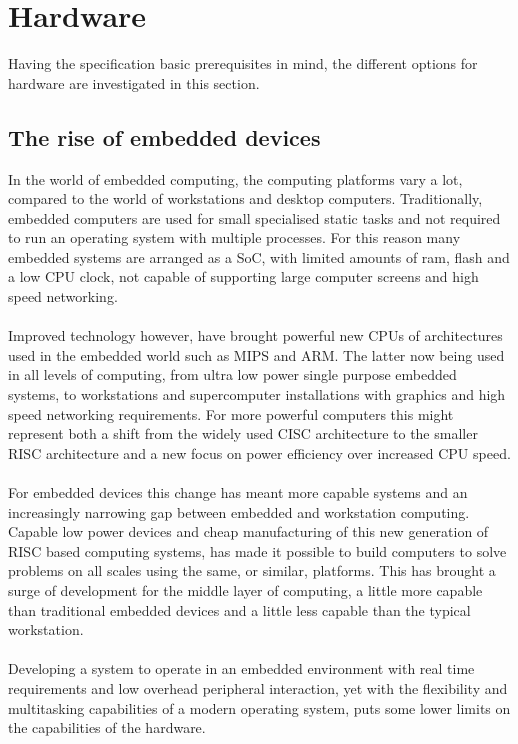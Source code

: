 \section{Hardware}
Having the \arinc{} specification basic prerequisites in mind, the
different options for hardware are investigated in this section.

\subsection{The rise of embedded devices}
In the world of embedded computing, the computing platforms vary a lot,
compared to the world of workstations and desktop computers.
Traditionally, embedded computers are used for small specialised static tasks and
not required to run an operating system with multiple processes.
For this reason many embedded systems are arranged as a SoC,
with limited amounts of ram, flash and a low CPU clock,
not capable of supporting large computer screens and high speed networking.
\\\\
Improved technology however, have brought powerful new CPUs of architectures used in the embedded world
such as MIPS and ARM.
The latter now being used in all levels of computing, from ultra low power single purpose embedded systems,
to workstations and supercomputer installations with graphics and high speed networking requirements.
For more powerful computers this might represent both a shift from the widely used CISC architecture
to the smaller RISC architecture and a new focus on power efficiency over increased CPU speed.
\\\\
For embedded devices this change has meant more capable systems
and an increasingly narrowing gap between embedded and workstation computing.
Capable low power devices and cheap manufacturing of this new generation of RISC based computing systems,
has made it possible to build computers to solve problems on all scales using the same, or similar, platforms.
This has brought a surge of development for the middle layer of computing,
a little more capable than traditional embedded devices and a little less capable than the typical workstation.
\\\\
Developing a system to operate in an embedded environment with real time requirements
and low overhead peripheral interaction,
yet with the flexibility and multitasking capabilities of a modern operating system,
puts some lower limits on the capabilities of the hardware.

